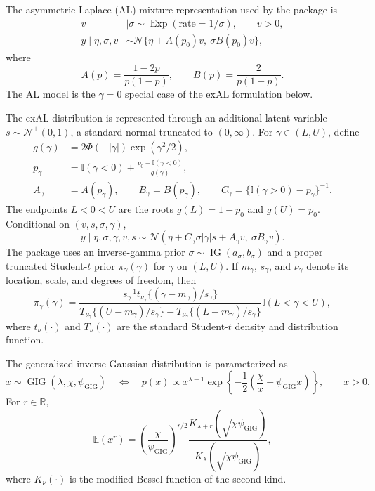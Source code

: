 \documentclass[nojss,noheadings]{jss}
\newcommand{\R}{\mathbb{R}}
\newcommand{\Ind}{\mathbb{I}}
\renewcommand{\E}{\mathbb{E}}
\newcommand{\N}{\mathcal{N}}
\newcommand{\TNp}{\mathcal{N}^{+}}
\newcommand{\IG}{\operatorname{IG}}
\newcommand{\GIG}{\operatorname{GIG}}
\newcommand{\Exp}{\operatorname{Exp}}
\newcommand{\pigamma}{\pi_\gamma}
\begin{document}
The asymmetric Laplace (AL) mixture representation used by the package is
\begin{align}
v &\mid \sigma \sim \Exp(\text{rate}=1/\sigma), \qquad v>0, \\
y \mid \eta,\sigma,v
&\sim \N\{ \eta + A(p_0)v,\ \sigma B(p_0)v \},
\end{align}
where
\begin{equation}
A(p)=\frac{1-2p}{p(1-p)}, \qquad B(p)=\frac{2}{p(1-p)}.
\label{eq:al_AB}
\end{equation}
The AL model is the $\gamma=0$ special case of the exAL formulation below.

The exAL distribution is represented through an additional latent variable
$s\sim\TNp(0,1)$, a standard normal truncated to $(0,\infty)$. For
$\gamma\in(L,U)$, define
\begin{align}
g(\gamma) &= 2\Phi(-|\gamma|)\exp(\gamma^2/2), \\
p_\gamma &= \Ind(\gamma<0) + \frac{p_0-\Ind(\gamma<0)}{g(\gamma)}, \\
A_\gamma &= A(p_\gamma), \qquad
B_\gamma = B(p_\gamma), \qquad
C_\gamma = \{\Ind(\gamma>0)-p_\gamma\}^{-1}.
\label{eq:exal_ABC}
\end{align}
The endpoints $L<0<U$ are the roots $g(L)=1-p_0$ and $g(U)=p_0$. Conditional on
$(v,s,\sigma,\gamma)$,
\begin{equation}
y\mid \eta,\sigma,\gamma,v,s
\sim
\N\left(\eta + C_\gamma\sigma|\gamma|s + A_\gamma v,\ 
\sigma B_\gamma v \right).
\label{eq:exal_aug}
\end{equation}
The package uses an inverse-gamma prior $\sigma\sim\IG(a_\sigma,b_\sigma)$
and a proper truncated Student-$t$ prior $\pigamma(\gamma)$ for $\gamma$ on
$(L,U)$. If $m_\gamma$, $s_\gamma$, and $\nu_\gamma$ denote its location,
scale, and degrees of freedom, then
\begin{equation}
\pigamma(\gamma)=
\frac{
s_\gamma^{-1}t_{\nu_\gamma}\{(\gamma-m_\gamma)/s_\gamma\}
}{
T_{\nu_\gamma}\{(U-m_\gamma)/s_\gamma\}
-T_{\nu_\gamma}\{(L-m_\gamma)/s_\gamma\}
}\Ind(L<\gamma<U),
\label{eq:gamma_prior}
\end{equation}
where $t_\nu(\cdot)$ and $T_\nu(\cdot)$ are the standard Student-$t$ density
and distribution function.

The generalized inverse Gaussian distribution is parameterized as
\begin{equation}
x\sim\GIG(\lambda,\chi,\psi_{\mathrm{GIG}})
\quad\Longleftrightarrow\quad
p(x)\propto x^{\lambda-1}
\exp\left\{-\frac{1}{2}\left(\frac{\chi}{x}+\psi_{\mathrm{GIG}} x\right)\right\},
\qquad x>0.
\label{eq:gig_parameterization}
\end{equation}
For $r\in\R$,
\begin{equation}
\E(x^r)=
\left(\frac{\chi}{\psi_{\mathrm{GIG}}}\right)^{r/2}
\frac{K_{\lambda+r}(\sqrt{\chi\psi_{\mathrm{GIG}}})}
{K_{\lambda}(\sqrt{\chi\psi_{\mathrm{GIG}}})},
\label{eq:gig_moments}
\end{equation}
where $K_\nu(\cdot)$ is the modified Bessel function of the second kind.
\end{document}
